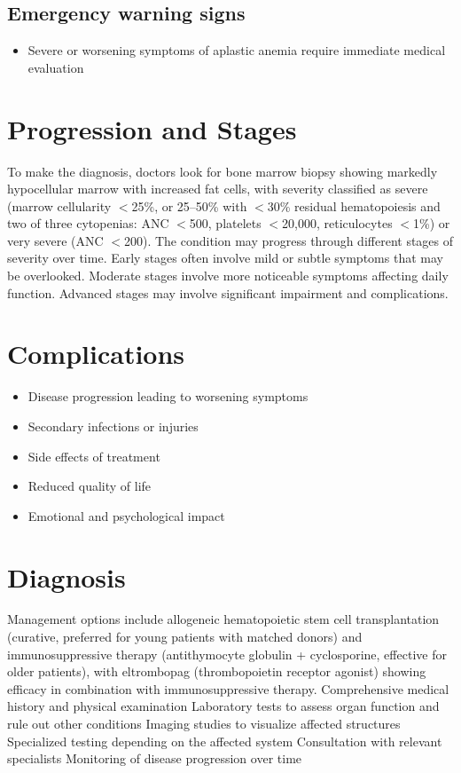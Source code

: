 \subsection{Emergency warning signs}
\begin{itemize}[noitemsep]
  \item Severe or worsening symptoms of aplastic anemia require immediate medical evaluation
\end{itemize}
\section{Progression and Stages}
To make the diagnosis, doctors look for bone marrow biopsy showing markedly hypocellular marrow with increased fat cells, with severity classified as severe (marrow cellularity $<$25\%, or 25--50\% with $<$30\% residual hematopoiesis and two of three cytopenias: ANC $<$500, platelets $<$20,000, reticulocytes $<$1\%) or very severe (ANC $<$200). The condition may progress through different stages of severity over time. Early stages often involve mild or subtle symptoms that may be overlooked. Moderate stages involve more noticeable symptoms affecting daily function. Advanced stages may involve significant impairment and complications.
\section{Complications}
\begin{itemize}[noitemsep]
  \item Disease progression leading to worsening symptoms
  \item Secondary infections or injuries
  \item Side effects of treatment
  \item Reduced quality of life
  \item Emotional and psychological impact
\end{itemize}
\section{Diagnosis}
Management options include allogeneic hematopoietic stem cell transplantation (curative, preferred for young patients with matched donors) and immunosuppressive therapy (antithymocyte globulin + cyclosporine, effective for older patients), with eltrombopag (thrombopoietin receptor agonist) showing efficacy in combination with immunosuppressive therapy. Comprehensive medical history and physical examination Laboratory tests to assess organ function and rule out other conditions Imaging studies to visualize affected structures Specialized testing depending on the affected system Consultation with relevant specialists Monitoring of disease progression over time

